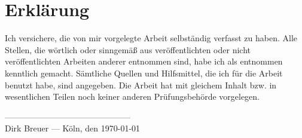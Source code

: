 \chapter{Erklärung}\label{chap:erklaerung}

Ich versichere, die von mir vorgelegte Arbeit selbständig verfasst zu haben. Alle Stellen, die wörtlich oder sinngemäß aus veröffentlichten oder nicht veröffentlichten Arbeiten anderer entnommen sind, habe ich als entnommen kenntlich gemacht. Sämtliche Quellen und Hilfsmittel, die ich für die Arbeit benutzt habe, sind angegeben. Die Arbeit hat mit gleichem Inhalt bzw. in wesentlichen Teilen noch keiner anderen Prüfungsbehörde vorgelegen.

\vspace{4cm}

\begin{flushright}
  ---------------------------------------------\\
  Dirk Breuer --- Köln, den \today
\end{flushright}

